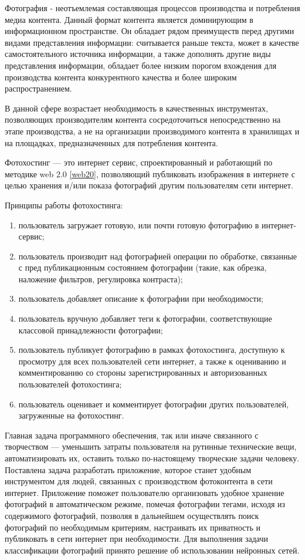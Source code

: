
Фотография - неотъемлемая составляющая процессов производства и потребления медиа контента.
Данный формат контента является доминирующим в информационном пространстве. Он обладает рядом преимуществ перед другими видами представления информации: считывается раньше текста, может в качестве самостоятельного источника информации, а также дополнять другие виды представления информации, обладает более низким порогом вхождения для производства контента конкурентного качества и более широким распространением.

В данной сфере возрастает необходимость в качественных инструментах, позволяющих производителям контента сосредоточиться непосредственно на этапе производства, а не на организации производимого контента в хранилищах и на площадках, предназначенных для потребления контента.

Фотохостинг — это интернет сервис, спроектированный и работающий по методике web 2.0 \ref{web20}, позволяющий публиковать изображения в интернете с целью хранения и/или показа фотографий другим пользователям сети интернет.

Принципы работы фотохостинга:
\begin{enumerate}
    \item пользователь загружает готовую, или почти готовую фотографию в интернет-сервис;
    \item пользователь производит над фотографией операции по обработке, связанные с пред публикационным состоянием фотографии (такие, как обрезка, наложение фильтров, регулировка контраста);
    \item пользователь добавляет описание к фотографии при необходимости;
    \item пользователь вручную добавляет теги к фотографии, соответствующие классовой принадлежности фотографии;
    \item пользователь публикует фотографию в рамках фотохостинга, доступную к просмотру для всех пользователей сети интернет, а также к оцениванию и комментированию со стороны зарегистрированных и авторизованных пользователей фотохостинга;
    \item пользователь оценивает и комментирует фотографии других пользователей, загруженные на фотохостинг.
\end{enumerate}
    
Главная задача программного обеспечения, так или иначе связанного с творчеством — уменьшить затраты пользователя на рутинные технические вещи, автоматизировать их, оставить только по-настоящему творческие задачи человеку.
Поставлена задача разработать приложение, которое станет удобным инструментом для людей, связанных с производством фотоконтента в сети интернет. 
Приложение поможет пользователю организовать удобное хранение фотографий в автоматическом режиме, помечая фотографии тегами, исходя из содержимого фотографий, позволяя в дальнейшем осуществлять поиск фотографий по необходимым критериям, настраивать их приватность и публиковать в сети интернет при необходимости. 
Для выполнения задачи классификации фотографий принято решение об использовании нейронных сетей.

\clearpage